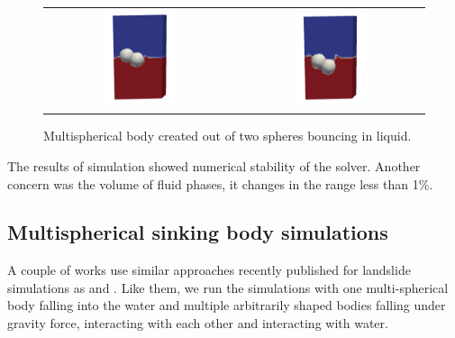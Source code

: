 \begin{figure}[!ht]
  \centering
  \begin{tabular}{cc}
    \includegraphics[width=0.4\textwidth]{Images/chap3/2_sph_2.jpg} & \includegraphics[width=0.4\textwidth]{Images/chap3/2_sph_1.jpg} 
  \end{tabular}
  \caption{Multispherical body created out of two spheres bouncing in liquid.}
  \label{fig:two-phase exp}
\end{figure}

The results of simulation showed numerical stability of the solver. Another concern was the volume of fluid phases, it changes in the range less than 1\%.

\subsection{Multispherical sinking body simulations}

A couple of works use similar approaches recently published for landslide simulations as \cite{nan2023high} and \cite{shen2022resolved}.
Like them, we run the simulations with one multi-spherical body falling into the water and multiple arbitrarily shaped bodies falling under gravity force, interacting with each other and interacting with water.

